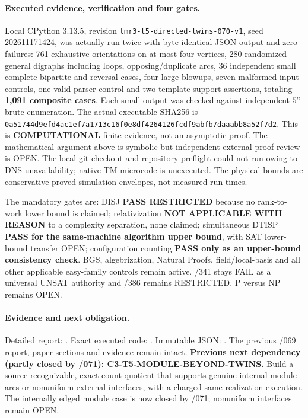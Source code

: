 \documentclass[11pt]{article}
\begin{document}
\paragraph{Executed evidence, verification and four gates.}
Local CPython 3.13.5, revision
\texttt{tmr3-t5-directed-twins-070-v1},
seed 202611171424, was actually run twice
with byte-identical JSON output and zero failures:
761 exhaustive orientations on at most four vertices,
280 randomized general digraphs including loops,
opposing/duplicate arcs, 36 independent small
complete-bipartite and reversal cases, four large blowups,
seven malformed input controls, one valid parser control
and two template-support assertions, totaling
\textbf{1,091 composite cases}. Each small output was
checked against independent $5^n$ brute enumeration.
The actual executable SHA256 is
\texttt{0a51744d9efd4ac1ef7a1713c16f0e8df4264126fcdf9abfb7daaabb8a52f7d2}.
This is \textbf{COMPUTATIONAL} finite evidence, not an
asymptotic proof. The mathematical argument above is
symbolic but independent external proof review is OPEN.
The local git checkout and repository preflight could
not run owing to DNS unavailability; native TM microcode
is unexecuted. The physical bounds are conservative
proved simulation envelopes, not measured run times.

The mandatory gates are:
DISJ \textbf{PASS RESTRICTED} because no
rank-to-work lower bound is claimed;
relativization \textbf{NOT APPLICABLE WITH REASON}
to a complexity separation, none claimed;
simultaneous DTISP \textbf{PASS for the same-machine
algorithm upper bound}, with SAT lower-bound transfer OPEN;
configuration counting \textbf{PASS only as an
upper-bound consistency check}. BGS, algebrization,
Natural Proofs, field/local-basis and all other
applicable easy-family controls remain active.
/341 stays FAIL as a universal UNSAT authority and
/386 remains RESTRICTED. P versus NP remains OPEN.

\paragraph{Evidence and next obligation.}
Detailed report:
.
Exact executed code:
.
Immutable JSON:
.
The previous /069 report, paper sections and evidence remain intact.
\textbf{Previous next dependency (partly closed by /071): C3-T5-MODULE-BEYOND-TWINS.}
Build a source-recognizable, exact-count quotient that supports
genuine internal module arcs or nonuniform external interfaces,
with a charged same-realization execution. The internally edged module case is now closed by /071; nonuniform interfaces remain OPEN.
\end{document}

